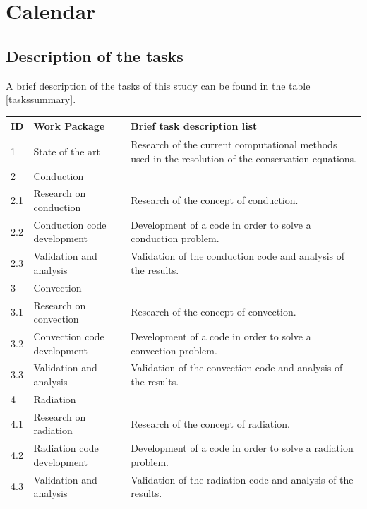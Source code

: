 
\section{Calendar}
\subsection{Description of the tasks}
A brief description of the tasks of this study can be found in the table \ref{taskssummary}.
\begin{longtable}{ | p{1.3cm} | p{3cm} | p{11cm} |}
\hline
\textbf{ID} & \textbf{Work Package} & \textbf{Brief task description list} \\ 
\hline
1 & State of the art & Research of the current computational methods used in the resolution of the conservation equations.\\ \hline
2 & \multicolumn{2}{|l|}{Conduction} \\ \hline
2.1 & Research on conduction & Research of the concept of conduction. \\ \hline
2.2 & Conduction code development & Development of a code in order to solve a conduction problem. \\ \hline
2.3 & Validation and analysis &  Validation of the conduction code and analysis of the results. \\ \hline
3 & \multicolumn{2}{|l|}{Convection} \\ \hline
3.1 & Research on convection & Research of the concept of convection. \\ \hline
3.2 & Convection code development & Development of a code in order to solve a convection problem. \\ \hline
3.3 & Validation and analysis &  Validation of the convection code and analysis of the results. \\ \hline
4 & \multicolumn{2}{|l|}{Radiation} \\ \hline
4.1 & Research on radiation & Research of the concept of radiation. \\ \hline
4.2 & Radiation code development & Development of a code in order to solve a radiation problem. \\ \hline
4.3 & Validation and analysis &  Validation of the radiation code and analysis of the results. \\ \hline

\end{longtable}
